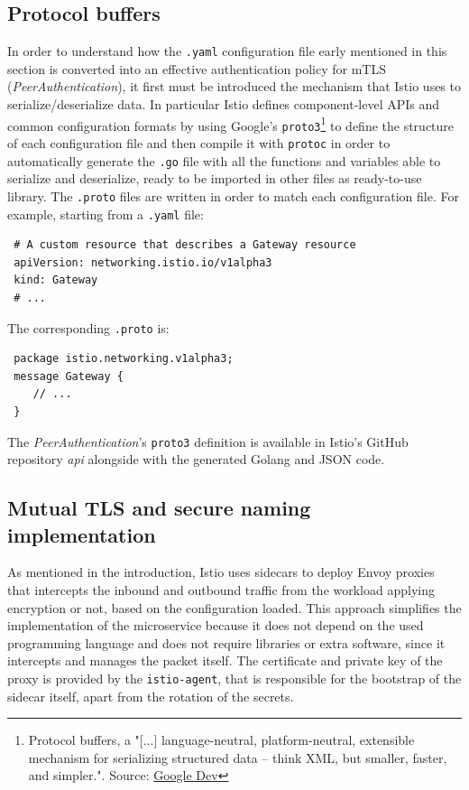 \subsection{Protocol buffers}
\label{protobuf}
In order to understand how the \texttt{.yaml} configuration file early mentioned in this section is converted into an effective authentication policy for mTLS (\textit{PeerAuthentication}), it first must be introduced the mechanism that Istio uses to serialize/deserialize data. In particular Istio defines component-level APIs and common configuration formats by using Google's \texttt{proto3}\footnote{Protocol buffers, a "[...] language-neutral, platform-neutral, extensible mechanism for serializing structured data – think XML, but smaller, faster, and simpler.". Source: \href{https://developers.google.com/protocol-buffers}{Google Dev}} to define the structure of each configuration file and then compile it with \texttt{protoc} in order to automatically generate the \texttt{.go} file with all the functions and variables able to serialize and deserialize, ready to be imported in other files as ready-to-use library. The \texttt{.proto} files are written in order to match each configuration file. For example, starting from a \texttt{.yaml} file:

\begin{lstlisting}
 # A custom resource that describes a Gateway resource
 apiVersion: networking.istio.io/v1alpha3
 kind: Gateway
 # ...
\end{lstlisting}

\noindent The corresponding \texttt{.proto} is:

\begin{lstlisting}
 package istio.networking.v1alpha3;
 message Gateway {
    // ...
 }
\end{lstlisting}

The \textit{PeerAuthentication}'s \texttt{proto3} definition is available in Istio's GitHub repository \textit{api} \cite{istioapi} alongside with the generated Golang and JSON code.

\subsection{Mutual TLS and secure naming implementation}
As mentioned in the introduction, Istio uses sidecars to deploy Envoy proxies that intercepts the inbound and outbound traffic from the workload applying encryption or not, based on the configuration loaded. This approach simplifies the implementation of the microservice because it does not depend on the used programming language and does not require libraries or extra software, since it intercepts and manages the packet itself. 
The certificate and private key of the proxy is provided by the \texttt{istio-agent}, that is responsible for the bootstrap of the sidecar itself, apart from the rotation of the secrets.

